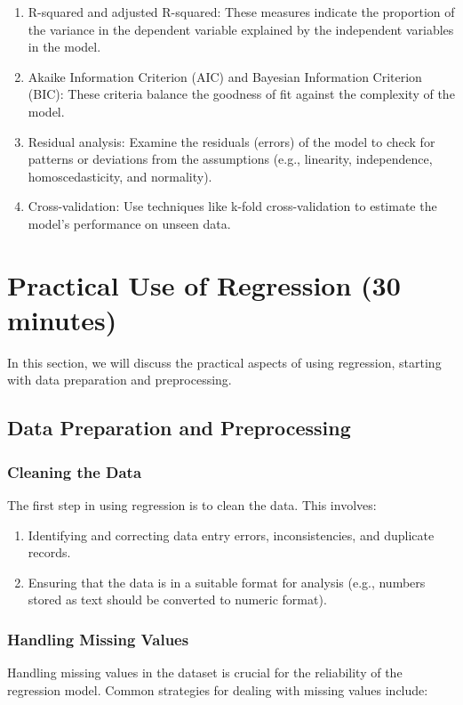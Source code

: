\documentclass{article}
\begin{document}
\begin{enumerate}
\item R-squared and adjusted R-squared: These measures indicate the proportion of the variance in the dependent variable explained by the independent variables in the model.
\item Akaike Information Criterion (AIC) and Bayesian Information Criterion (BIC): These criteria balance the goodness of fit against the complexity of the model.
\item Residual analysis: Examine the residuals (errors) of the model to check for patterns or deviations from the assumptions (e.g., linearity, independence, homoscedasticity, and normality).
\item Cross-validation: Use techniques like k-fold cross-validation to estimate the model's performance on unseen data.
\end{enumerate}

\section{Practical Use of Regression (30 minutes)}

In this section, we will discuss the practical aspects of using regression, starting with data preparation and preprocessing.

\subsection{Data Preparation and Preprocessing}

\subsubsection{Cleaning the Data}
The first step in using regression is to clean the data. This involves:

\begin{enumerate}
\item Identifying and correcting data entry errors, inconsistencies, and duplicate records.
\item Ensuring that the data is in a suitable format for analysis (e.g., numbers stored as text should be converted to numeric format).
\end{enumerate}

\subsubsection{Handling Missing Values}
Handling missing values in the dataset is crucial for the reliability of the regression model. Common strategies for dealing with missing values include:
\end{document}
